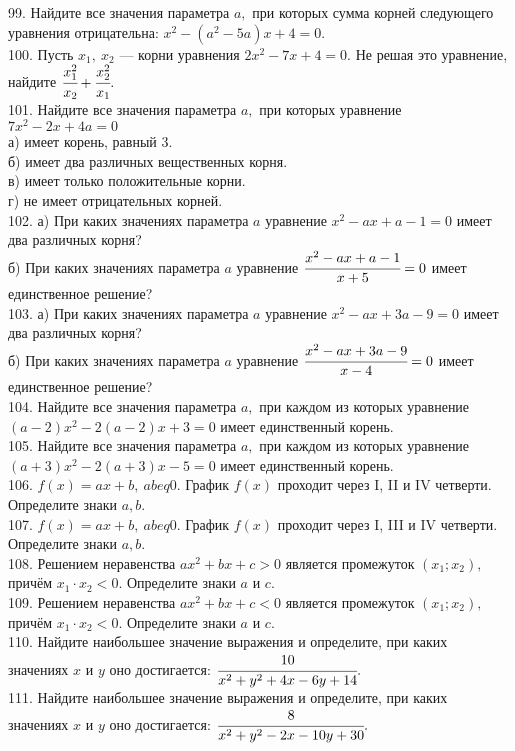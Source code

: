 99. Найдите все значения параметра $a,$ при которых сумма корней следующего уравнения отрицательна: $x^2-(a^2-5a)x+4=0.$\\
100. Пусть $x_1,\ x_2$ --- корни уравнения $2x^2-7x+4=0.$ Не решая это уравнение, найдите $\cfrac{x_1^2}{x_2}+\cfrac{x_2^2}{x_1}.$\\
101. Найдите все значения параметра $a,$ при которых уравнение $7x^2-2x+4a=0$\\
а) имеет корень, равный 3.\\
б) имеет два различных вещественных корня.\\
в) имеет только положительные корни.\\
г) не имеет отрицательных корней.\\
102. а) При каких значениях параметра $a$ уравнение $x^2-ax+a-1=0$ имеет два различных корня?\\
б) При каких значениях параметра $a$ уравнение $\cfrac{x^2-ax+a-1}{x+5}=0$ имеет единственное решение?\\
103. а) При каких значениях параметра $a$ уравнение $x^2-ax+3a-9=0$ имеет два различных корня?\\
б) При каких значениях параметра $a$ уравнение $\cfrac{x^2-ax+3a-9}{x-4}=0$ имеет единственное решение?\\
104. Найдите все значения параметра $a,$ при каждом из которых уравнение
$(a - 2)x^2 - 2(a - 2)x + 3 = 0$ имеет единственный корень.\\
105. Найдите все значения параметра $a,$ при каждом из которых уравнение
$(a + 3)x^2 - 2(a + 3)x - 5 = 0$ имеет единственный корень.\\
106. $f(x)=ax+b,\ ab
eq 0.$ График $f(x)$ проходит через I, II и IV четверти. Определите знаки $a,b.$\\
107. $f(x)=ax+b,\ ab
eq 0.$ График $f(x)$ проходит через I, III и IV четверти. Определите знаки $a,b.$\\
108. Решением неравенства $ax^2 + bx + c > 0$ является промежуток $(x_1; x_2),$ причём $x_1\cdot x_2 <  0.$ Определите знаки $a$ и $c.$\\
109. Решением неравенства $ax^2 + bx + c < 0$ является промежуток $(x_1; x_2),$ причём $x_1\cdot x_2 <  0.$ Определите знаки $a$ и $c.$\\
110. Найдите наибольшее значение выражения и определите, при каких значениях $x$ и $y$ оно достигается: $\cfrac{10}{x^2+y^2+4x-6y+14}.$\\
111. Найдите наибольшее значение выражения и определите, при каких значениях $x$ и $y$ оно достигается: $\cfrac{8}{x^2+y^2-2x-10y+30}.$\\
